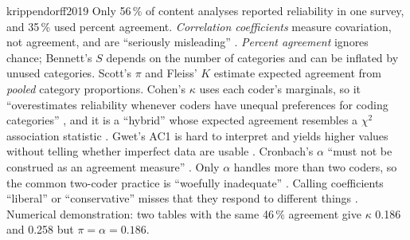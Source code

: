 \begin{papercard}{krippendorff2019}
 Only 56\,\% of content analyses reported reliability in one survey, and 35\,\% used percent agreement. \emph{Correlation coefficients} measure covariation, not agreement, and are ``seriously misleading'' . \emph{Percent agreement} ignores chance; Bennett's $S$ depends on the number of categories and can be inflated by unused categories. Scott's $\pi$ and Fleiss' $K$ estimate expected agreement from \emph{pooled} category proportions. Cohen's $\kappa$ uses each coder's marginals, so it ``overestimates reliability whenever coders have unequal preferences for coding categories'' , and it is a ``hybrid'' whose expected agreement resembles a $\chi^2$ association statistic . Gwet's AC1 is hard to interpret and yields higher values without telling whether imperfect data are usable . Cronbach's $\alpha$ ``must not be construed as an agreement measure'' . Only $\alpha$ handles more than two coders, so the common two-coder practice is ``woefully inadequate'' . Calling coefficients ``liberal'' or ``conservative'' misses that they respond to different things . Numerical demonstration: two tables with the same 46\,\% agreement give $\kappa$ 0.186 and 0.258 but $\pi=\alpha=0.186$.


\end{papercard}
